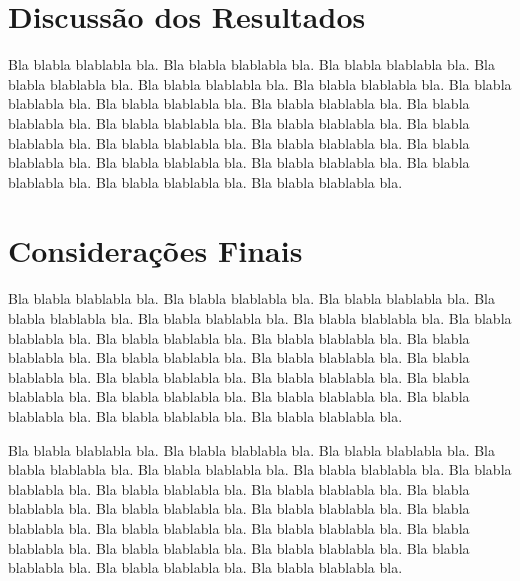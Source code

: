 \documentclass[diss,capa]{texufpel}
\begin{document}
\chapter{Discussão dos Resultados}

  Bla blabla blablabla bla.  Bla blabla blablabla bla.  Bla blabla
  blablabla bla.  Bla blabla blablabla bla.  Bla blabla blablabla bla.
  Bla blabla blablabla bla.  Bla blabla blablabla bla.  Bla blabla
  blablabla bla.  Bla blabla blablabla bla.  Bla blabla blablabla bla.
  Bla blabla blablabla bla.  Bla blabla blablabla bla.  Bla blabla
  blablabla bla.  Bla blabla blablabla bla.  Bla blabla blablabla bla.
  Bla blabla blablabla bla.  Bla blabla blablabla bla.  Bla blabla
  blablabla bla.  Bla blabla blablabla bla.  Bla blabla blablabla bla.
  Bla blabla blablabla bla.

\chapter{Considerações Finais}

Bla blabla blablabla bla.  Bla blabla blablabla bla.  Bla blabla
blablabla bla.  Bla blabla blablabla bla.  Bla blabla blablabla bla.
Bla blabla blablabla bla.  Bla blabla blablabla bla.  Bla blabla
blablabla bla.  Bla blabla blablabla bla.  Bla blabla blablabla bla.
Bla blabla blablabla bla.  Bla blabla blablabla bla.  Bla blabla
blablabla bla.  Bla blabla blablabla bla.  Bla blabla blablabla bla.
Bla blabla blablabla bla.  Bla blabla blablabla bla.  Bla blabla
blablabla bla.  Bla blabla blablabla bla.  Bla blabla blablabla bla.
Bla blabla blablabla bla.

Bla blabla blablabla bla.  Bla blabla blablabla bla.  Bla blabla
blablabla bla.  Bla blabla blablabla bla.  Bla blabla blablabla bla.
Bla blabla blablabla bla.  Bla blabla blablabla bla.  Bla blabla
blablabla bla.  Bla blabla blablabla bla.  Bla blabla blablabla bla.
Bla blabla blablabla bla.  Bla blabla blablabla bla.  Bla blabla
blablabla bla.  Bla blabla blablabla bla.  Bla blabla blablabla bla.
Bla blabla blablabla bla.  Bla blabla blablabla bla.  Bla blabla
blablabla bla.  Bla blabla blablabla bla.  Bla blabla blablabla bla.
Bla blabla blablabla bla.



 
\end{document}
